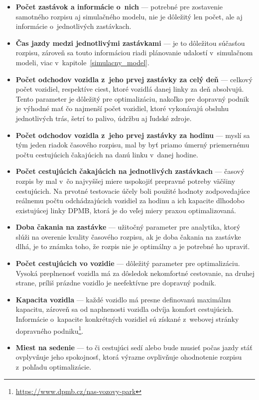 \begin{itemize}
  \item \textbf{Počet zastávok a informácie o~nich} --- potrebné pre zostavenie samotného rozpisu aj simulačného modelu, nie je dôležitý len počet, ale aj informácie o~jednotlivých zastávkach.
  \item \textbf{Čas jazdy medzi jednotlivými zastávkami} --- je to dôležitou súčasťou rozpisu, zároveň sa touto informáciou riadi plánovanie udalostí v~simulačnom modeli, viac v~kapitole~\ref{simulacny_model}.
  \item \textbf{Počet odchodov vozidla z~jeho prvej zastávky za celý deň} --- celkový počet vozidiel, respektíve ciest, ktoré vozidlá danej linky za deň absolvujú. Tento parameter je dôležitý pre optimalizáciu, nakoľko pre dopravný podnik je výhodné mať čo najmenší počet vozidiel, ktoré vykonávajú obsluhu jednotlivých trás, šetrí to palivo, údržbu aj ľudské zdroje.
  \item \textbf{Počet odchodov vozidla z~jeho prvej zastávky za hodinu} --- myslí sa tým jeden riadok časového rozpisu, mal by byť priamo úmerný priemernému počtu cestujúcich čakajúcich na danú linku v~danej hodine.
  \item \textbf{Počet cestujúcich čakajúcich na jednotlivých zastávkach} --- časový rozpis by mal v~čo najvyššej miere uspokojiť prepravné potreby väčšiny cestujúcich. Na prvotné testovacie účely boli použité hodnoty zodpovedajúce reálnemu počtu odchádzajúcich vozidiel za hodinu a ich kapacite dlhodobo existujúcej linky DPMB, ktorá je do veľej miery praxou optimalizovaná.
  \item \textbf{Doba čakania na zastávke} --- užitočný parameter pre analytika, ktorý slúži na overenie kvality časového rozpisu, ak je doba čakania na zastávke dlhá, je to známka toho, že rozpis nie je optimálny a je potrebné ho upraviť.
  \item \textbf{Počet cestujúcich vo vozidie} --- dôležitý parameter pre optimalizáciu. Vysoká preplnenosť vozidla má za dôsledok nekomfortné cestovanie, na druhej strane, príliš prázdne vozidlo je neefektívne pre dopravný podnik.
  \item \textbf{Kapacita vozidla} --- každé vozidlo má presne definovanú maximálnu kapacitu, zároveň sa od naplnenosti vozidla odvíja komfort cestujúcich. Informácie o~kapacite konkrétných vozidiel sú získané z~webovej stránky dopravného podniku\footnote{\url{https://www.dpmb.cz/nas-vozovy-park}}.
  \item \textbf{Miest na sedenie} --- to či cestujúci sedí alebo bude musieť počas jazdy stáť ovplyvňuje jeho spokojnosť, ktorá výrazne ovplivňuje ohodnotenie rozpisu z~pohľadu optimalizácie.

\end{itemize}
